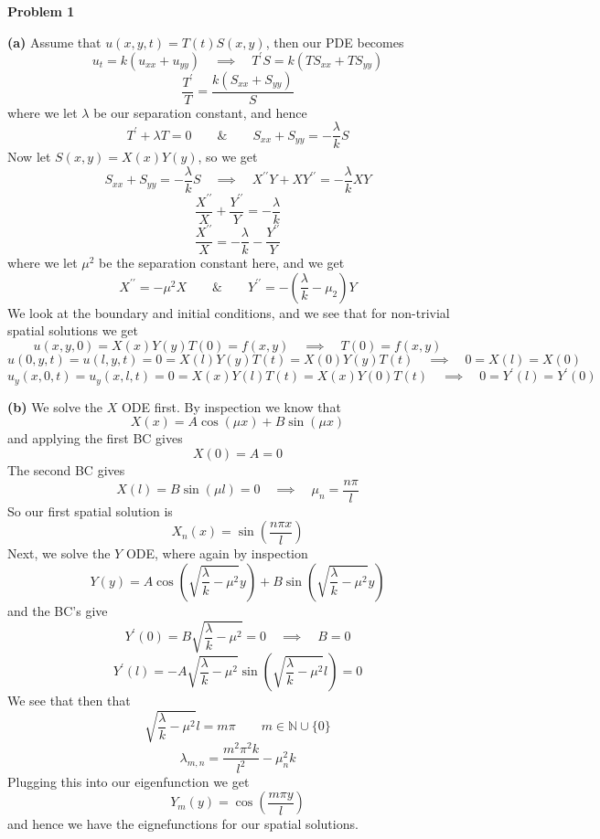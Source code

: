 \documentclass[10pt]{article}
\begin{document}
\textbf{Problem 1}

\textbf{(a)}
Assume that $u(x,y,t) = T(t)S(x,y)$, then our PDE becomes
$$u_{t} = k(u_{xx} + u_{yy}) \hspace{1em} \implies \hspace{1em} T^{\prime}S = k(TS_{xx} + TS_{yy})$$
$$\frac{T^{\prime}}{T} = \frac{k(S_{xx} + S_{yy})}{S}$$
where we let $\lambda$ be our separation constant, and hence
$$T^{\prime} + \lambda T = 0 \hspace{2em} \& \hspace{2em} S_{xx} + S_{yy} = -\frac{\lambda}{k}S$$
Now let $S(x,y) = X(x)Y(y)$, so we get
$$S_{xx} + S_{yy} = -\frac{\lambda}{k}S \hspace{1em} \implies \hspace{1em} X^{\prime \prime}Y + XY^{\prime \prime} = -\frac{\lambda}{k}XY$$
$$\frac{X^{\prime \prime}}{X} + \frac{Y^{\prime \prime}}{Y} = -\frac{\lambda}{k}$$
$$\frac{X^{\prime \prime}}{X} = -\frac{\lambda}{k} - \frac{Y^{\prime \prime}}{Y}$$
where we let $\mu^{2}$ be the separation constant here, and we get
$$X^{\prime \prime} = -\mu^{2} X \hspace{2em} \& \hspace{2em} Y^{\prime \prime} = -\left(\frac{\lambda}{k} - \mu_{2}\right)Y$$
We look at the boundary and initial conditions, and we see that for non-trivial spatial solutions we get
$$u(x,y,0) = X(x)Y(y)T(0) = f(x,y) \hspace{1em} \implies \hspace{1em} T(0) = f(x,y)$$
$$u(0,y,t) = u(l,y,t) = 0 = X(l)Y(y)T(t) = X(0)Y(y)T(t) \hspace{1em} \implies \hspace{1em}  0 = X(l) = X(0)$$
$$u_{y}(x,0,t) = u_{y}(x,l,t) = 0 = X(x)Y(l)T(t) = X(x)Y(0)T(t) \hspace{1em} \implies \hspace{1em}  0 = Y^{\prime}(l) = Y^{\prime}(0)$$

\textbf{(b)}
We solve the $X$ ODE first. By inspection we know that
$$X(x) = A\cos(\mu x) + B\sin(\mu x)$$
and applying the first BC gives
$$X(0) = A = 0$$
The second BC gives
$$X(l) = B\sin(\mu l) = 0 \hspace{1em} \implies \hspace{1em} \mu_{n} = \frac{n\pi}{l}$$
So our first spatial solution is
$$X_{n}(x) = \sin\left(\frac{n\pi x}{l}\right)$$
Next, we solve the $Y$ ODE, where again by inspection
$$Y(y) = A\cos\left({\sqrt{\frac{\lambda}{k} - \mu^{2}}y}\right) + B\sin\left({\sqrt{\frac{\lambda}{k} - \mu^{2}}y}\right)$$
and the BC's give
$$Y^{\prime}(0) = B\sqrt{\frac{\lambda}{k} - \mu^{2}} = 0 \hspace{1em} \implies \hspace{1em} B = 0$$
$$Y^{\prime}(l) = -A\sqrt{\frac{\lambda}{k} - \mu^{2}}\sin\left(\sqrt{\frac{\lambda}{k} - \mu^{2}}l\right) = 0$$
We see that then that
$$\sqrt{\frac{\lambda}{k} - \mu^{2}}l = m\pi \hspace{2em} m\in\mathbb{N}\cup\{0\}$$
$$\lambda_{m,n} = \frac{m^{2}\pi^{2}k}{l^{2}} - \mu^{2}_{n}k$$
Plugging this into our eigenfunction we get
$$Y_{m}(y) = \cos\left(\frac{m\pi y}{l}\right)$$
and hence we have the eignefunctions for our spatial solutions.
\end{document}

